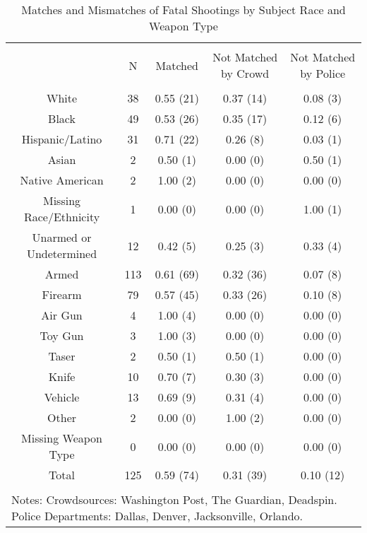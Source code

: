 
\begin{table}[!htbp] \centering 
  \caption{Matches and Mismatches of Fatal Shootings by Subject Race and Weapon Type} 
  \label{} 
\footnotesize 
\begin{tabular}{@{\extracolsep{5pt}} ccccc} 
\\[-1.8ex]\hline 
\hline \\[-1.8ex] 
 & N & Matched & Not Matched by Crowd & Not Matched by Police \\ 
\hline \\[-1.8ex] 
White & 38 & 0.55 (21) & 0.37 (14) & 0.08 (3) \\ 
Black & 49 & 0.53 (26) & 0.35 (17) & 0.12 (6) \\ 
Hispanic/Latino & 31 & 0.71 (22) & 0.26 (8) & 0.03 (1) \\ 
Asian & 2 & 0.50 (1) & 0.00 (0) & 0.50 (1) \\ 
Native American & 2 & 1.00 (2) & 0.00 (0) & 0.00 (0) \\ 
Missing Race/Ethnicity & 1 & 0.00 (0) & 0.00 (0) & 1.00 (1) \\ 
Unarmed or Undetermined & 12 & 0.42 (5) & 0.25 (3) & 0.33 (4) \\ 
Armed & 113 & 0.61 (69) & 0.32 (36) & 0.07 (8) \\ 
Firearm & 79 & 0.57 (45) & 0.33 (26) & 0.10 (8) \\ 
Air Gun & 4 & 1.00 (4) & 0.00 (0) & 0.00 (0) \\ 
Toy Gun & 3 & 1.00 (3) & 0.00 (0) & 0.00 (0) \\ 
Taser & 2 & 0.50 (1) & 0.50 (1) & 0.00 (0) \\ 
Knife & 10 & 0.70 (7) & 0.30 (3) & 0.00 (0) \\ 
Vehicle & 13 & 0.69 (9) & 0.31 (4) & 0.00 (0) \\ 
Other & 2 & 0.00 (0) & 1.00 (2) & 0.00 (0) \\ 
Missing Weapon Type & 0 & 0.00 (0) & 0.00 (0) & 0.00 (0) \\ 
Total & 125 & 0.59 (74) & 0.31 (39) & 0.10 (12) \\ 
\hline \\[-1.8ex] 
\multicolumn{5}{l}{Notes: Crowdsources: Washington Post, The Guardian, Deadspin. Police Departments: Dallas, Denver, Jacksonville, Orlando.} \\ 
\end{tabular} 
\end{table}  
